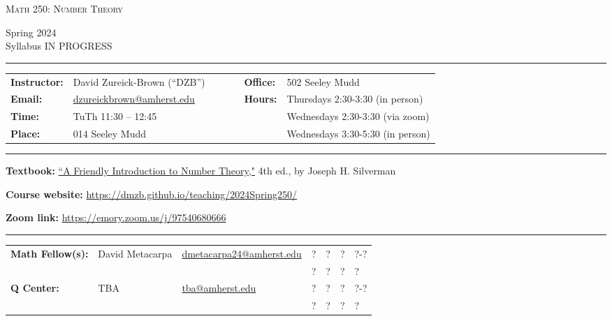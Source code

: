 \documentclass[12pt]{article}
\begin{document}
\begin{center}
{\Large \textsc{Math 250: Number Theory}}
\end{center}
\begin{center}
  Spring 2024
  \\
  {\color{red}Syllabus IN PROGRESS}
\end{center}

\hrule \smallskip

\noindent \begin{tabular}{@{}llcccll}
\textbf{Instructor:} & David Zureick-Brown (``DZB'') & & & & \textbf{Office:} & 502 Seeley Mudd \\
 \textbf{Email:} & \href{mailto: dzureickbrown@amherst.edu}{dzureickbrown@amherst.edu} & & & & \textbf{Hours:} & Thursdays 2:30-3:30 (in person)\\
 \textbf{Time:} & TuTh 11:30 -- 12:45  & & & & &Wednesdays 2:30-3:30 (via zoom) \\
 \textbf{Place:} & 014 Seeley Mudd & & & & & Wednesdays 3:30-5:30 (in person)
\end{tabular}

\smallskip \hrule \medskip

\noindent\textbf{Textbook:}
\href{https://www.math.brown.edu/johsilve/frint.html}
{``A Friendly Introduction to Number Theory,"} 4th ed., by Joseph H. Silverman
\medskip



\noindent\textbf{Course website:} \url{https://dmzb.github.io/teaching/2024Spring250/}
\medskip

\noindent\textbf{Zoom link:} \url{https://emory.zoom.us/j/97540680666}

\smallskip \hrule \medskip

\noindent \begin{tabular}{@{}lllllll}

\textbf{Math Fellow(s):} & David Metacarpa & \href{mailto: dmetacarpa24@amherst.edu}{dmetacarpa24@amherst.edu} 
   & ? &? & ? & ?-? \\
 & &   & ? & ? & ? & ?\\ 

\textbf{Q Center:}& TBA & \href{mailto: atanguay@amherst.edu}{tba@amherst.edu}     & ? &? & ? & ?-? \\
 & &   & ? & ? & ? & ?\\ 

\end{tabular}

\end{document}
